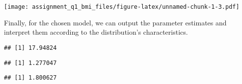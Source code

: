 \begin{Shaded}
\begin{Highlighting}[]
\end{Highlighting}
\end{Shaded}

\texttt{[image: assignment\_q1\_bmi\_files/figure-latex/unnamed-chunk-1-3.pdf]}

Finally, for the chosen model, we can output the parameter estimates and
interpret them according to the distribution's characteristics.

\begin{Shaded}
\begin{Highlighting}[]
\NormalTok{)[}\NormalTok{]}
\end{Highlighting}
\end{Shaded}

\begin{verbatim}
## [1] 17.94824
\end{verbatim}

\begin{Shaded}
\begin{Highlighting}[]
\NormalTok{)[}\NormalTok{]}
\end{Highlighting}
\end{Shaded}

\begin{verbatim}
## [1] 1.277047
\end{verbatim}

\begin{Shaded}
\begin{Highlighting}[]
\NormalTok{)[}\NormalTok{]}
\end{Highlighting}
\end{Shaded}

\begin{verbatim}
## [1] 1.800627
\end{verbatim}

\begin{Shaded}
\begin{Highlighting}[]
\end{Highlighting}
\end{Shaded}


